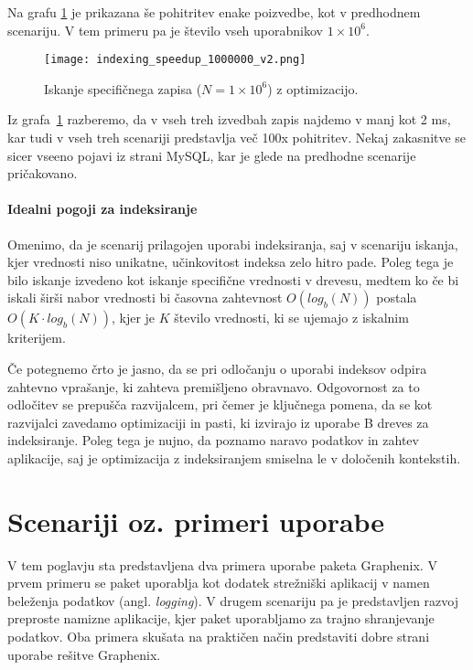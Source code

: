 \documentclass[a4paper,12pt,openright]{book}
\begin{document}
    Na grafu \ref{idx_speedup_2} je prikazana še pohitritev enake poizvedbe, kot v predhodnem scenariju. V tem primeru pa je število vseh uporabnikov $1 \times 10^6$.
    
    \begin{figure}[H]
        \centerline{\texttt{[image: indexing\_speedup\_1000000\_v2.png]}}
        \caption{Iskanje specifičnega zapisa ($N = 1 \times 10^6$) z optimizacijo.}
        \label{idx_speedup_2}
    \end{figure}

    \noindent
    Iz grafa~\ref{idx_speedup_2} razberemo, da v vseh treh izvedbah zapis najdemo v manj kot 2 ms, kar tudi v vseh treh scenariji predstavlja več 100x pohitritev. Nekaj zakasnitve se sicer vseeno pojavi iz strani MySQL, kar je glede na predhodne scenarije pričakovano.

    \subsubsection{Idealni pogoji za indeksiranje}
    Omenimo, da je scenarij prilagojen uporabi indeksiranja, saj v scenariju iskanja, kjer vrednosti niso unikatne, učinkovitost indeksa zelo hitro pade. Poleg tega je bilo iskanje izvedeno kot iskanje specifične vrednosti v drevesu, medtem ko če bi iskali širši nabor vrednosti bi časovna zahtevnost $O(log_b(N))$ postala $O(K \cdot log_b(N))$, kjer je $K$ število vrednosti, ki se ujemajo z iskalnim kriterijem.

    Če potegnemo črto je jasno, da se pri odločanju o uporabi indeksov odpira zahtevno vprašanje, ki zahteva premišljeno obravnavo. Odgovornost za to odločitev se prepušča razvijalcem, pri čemer je ključnega pomena, da se kot razvijalci zavedamo optimizaciji in pasti, ki izvirajo iz uporabe B dreves za indeksiranje. Poleg tega je nujno, da poznamo naravo podatkov in zahtev aplikacije, saj je optimizacija z indeksiranjem smiselna le v določenih kontekstih.

\chapter{Scenariji oz. primeri uporabe}
\label{ch3}

    V tem poglavju sta predstavljena dva primera uporabe paketa Graphenix. V prvem primeru se paket uporablja kot dodatek strežniški aplikacij v namen beleženja podatkov (angl. \textit{logging}). V drugem scenariju pa je predstavljen razvoj preproste namizne aplikacije, kjer paket uporabljamo za trajno shranjevanje podatkov. Oba primera skušata na praktičen način predstaviti dobre strani uporabe rešitve Graphenix.
\end{document}
